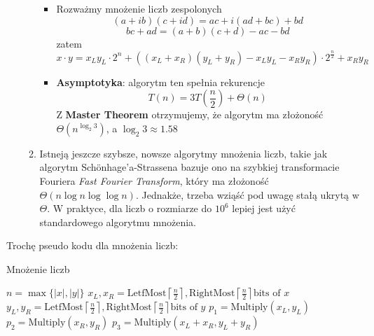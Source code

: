 \documentclass[11pt,a4paper]{article}
\begin{document}
\begin{itemize}
\begin{enumerate}
                \begin{itemize}
                    \item Rozważmy mnożenie liczb zespolonych
                        \[
                            (a+ib)(c+id) = ac + i(ad+bc) + bd
                        \]
                        \[
                            bc + ad = (a+b)(c+d) - ac - bd
                        \]
                        zatem
                        \[
                            x \cdot y = x_Ly_L \cdot 2^n + ((x_L + x_R)(y_L + y_R) - x_Ly_L - x_Ry_R) \cdot 2^{\frac{n}{2}} + x_Ry_R
                        \]
                    \item \textbf{Asymptotyka}: algorytm ten spełnia rekurencje
                        \[
                            T(n) = 3T(\frac{n}{2}) + \Theta(n)
                        \]
                        Z \textbf{Master Theorem} otrzymujemy, że algorytm ma złożoność $\Theta(n^{\log_2 3})$, a $\log_2 3 \approx 1.58$
                \end{itemize}
            \item Istneją jeszcze szybsze, nowsze algorytmy mnożenia liczb, takie jak algorytm Schönhage'a-Strassena bazuje ono na szybkiej transformacie Fouriera \textit{Fast Fourier Transform}, który ma złożoność $\Theta(n \log n \log \log n)$. Jednakże, trzeba wziąść pod uwagę stałą ukrytą w $\Theta$. W praktyce, dla liczb o rozmiarze do $10^6$ lepiej jest użyć standardowego algorytmu mnożenia.
        \end{enumerate}
\end{itemize}
Trochę pseudo kodu dla mnożenia liczb:
\begin{algorithm}
    \caption{Mnożenie liczb}
    \begin{algorithmic}[1]
        \State $n = \max\{|x|, |y|\}$
        \State {}
        \EndIf
        \State $x_L, x_R = \text{LetfMost}\left\lceil\frac{n}{2}\right\rceil, \text{RightMost}\left\lceil\frac{n}{2}\right\rceil \text{bits of $x$}$
        \State $y_L, y_R = \text{LetfMost}\left\lceil\frac{n}{2}\right\rceil, \text{RightMost}\left\lceil\frac{n}{2}\right\rceil \text{bits of $y$}$
        \State $p_1 = \text{Multiply}(x_L, y_L)$
        \State $p_2 = \text{Multiply}(x_R, y_R)$
        \State $p_3 = \text{Multiply}(x_L + x_R, y_L + y_R)$
        \State {}
        \EndProcedure
    \end{algorithmic}
\end{algorithm}
\end{document}
